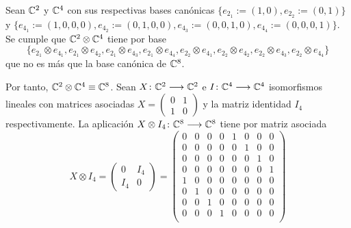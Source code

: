 \begin{example} Sean $\mathbb{C}^2$ y $\mathbb{C}^4$ con sus respectivas bases canónicas $\{e_{2_1}:=(1,0),e_{2_2}:=(0,1)\}$ y $\{e_{4_1}:=(1,0,0,0),e_{4_2}:=(0,1,0,0), e_{4_3}:=(0,0,1,0),e_{4_4}:=(0,0,0,1)\}$. Se cumple que $\mathbb{C}^2\otimes\mathbb{C}^4$ tiene por base $$\{e_{2_1}\otimes e_{4_1},e_{2_1}\otimes e_{4_2},e_{2_1}\otimes e_{4_3},e_{2_1}\otimes e_{4_4},e_{2_2}\otimes e_{4_1},e_{2_2}\otimes e_{4_2},e_{2_2}\otimes e_{4_3},e_{2_2}\otimes e_{4_4}\}$$ 
que no es más que la base canónica de $\mathbb{C}^8$.

Por tanto, $\mathbb{C}^2\otimes\mathbb{C}^4\equiv\mathbb{C}^8$. Sean $X\colon \mathbb{C}^2\longrightarrow \mathbb{C}^2$ e $I\colon \mathbb{C}^4\longrightarrow \mathbb{C}^4$ isomorfismos lineales con matrices asociadas $X=\left(\begin{matrix}
0&1\\1&0\end{matrix}\right)$ y la matriz identidad $I_4$ respectivamente. La aplicación $X\otimes I_4\colon \mathbb{C}^8\longrightarrow \mathbb{C}^8$ tiene por matriz asociada
\[
X\otimes I_4=
\left(\begin{matrix}
0&I_4\\
I_4&0
\end{matrix}\right)
=
\left(\begin{matrix}
0&0&0&0&1&0&0&0\\
0&0&0&0&0&1&0&0\\
0&0&0&0&0&0&1&0\\
0&0&0&0&0&0&0&1\\
1&0&0&0&0&0&0&0\\
0&1&0&0&0&0&0&0\\
0&0&1&0&0&0&0&0\\
0&0&0&1&0&0&0&0\\
\end{matrix}\right)\]


\end{example}
